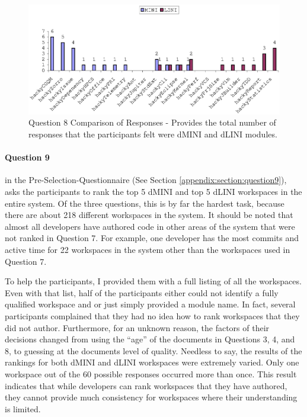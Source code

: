 \begin{figure}[!h]
  \centering
  \includegraphics[width=1.0\textwidth]{figs/Results/pre-selection-questionnaire-8-compare.eps}
  \caption[Question 8 Comparison]{Question 8 Comparison of Responses -
    Provides the total number of responses that the participants felt were
    dMINI and dLINI modules.}
  \label{fig:pre-selection-questionnaire-results-8-compare}
\end{figure}


\paragraph{Question 9} in the Pre-Selection-Questionnaire (See Section
\ref{appendix:section:question9}), asks the participants to rank the top 5
dMINI and top 5 dLINI workspaces in the entire system. Of the three
questions, this is by far the hardest task, because there are about 218
different workspaces in the system. It should be noted that almost all
developers have authored code in other areas of the system that were not
ranked in Question 7. For example, one developer has the most commits and
active time for 22 workspaces in the system other than the workspaces used
in Question 7.

To help the participants, I provided them with a full listing of all the
workspaces. Even with that list, half of the participants either could not
identify a fully qualified workspace and or just simply provided a module
name. In fact, several participants complained that they had no idea how to
rank workspaces that they did not author. Furthermore, for an unknown
reason, the factors of their decisions changed from using the ``age'' of
the documents in Questions 3, 4, and 8, to guessing at the documents level
of quality. Needless to say, the results of the rankings for both dMINI and
dLINI workspaces were extremely varied. Only one workspace out of the 60
possible responses occurred more than once. This result indicates that
while developers can rank workspaces that they have authored, they cannot
provide much consistency for workspaces where their understanding is
limited.

